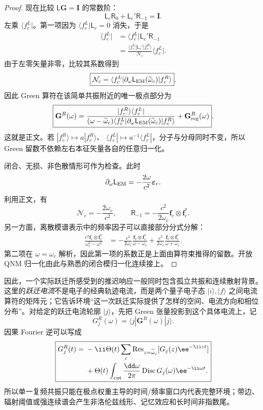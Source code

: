 \begin{proof}
现在比较 \(\mathsf L\mathbf G=\mathbf I\) 的常数阶：
\[
\mathsf L_c\mathsf R_0
+\mathsf L_c'\mathsf R_{-1}
=\mathbf I.
\]
左乘 \(\langle f_c^L|\)。第一项因为
\(\langle f_c^L|\mathsf L_c=0\) 消失，于是
\begin{align*}
\langle f_c^L|
&=\langle f_c^L|\mathsf L_c'\mathsf R_{-1}\\
&=\frac{\langle f_c^L|\mathsf L_c'|f_c^R\rangle}
{\mathcal N_c}\langle f_c^L|.
\end{align*}
由于左零矢量非零，比较其系数得到
\[
\boxed{
\mathcal N_c
=\langle f_c^L|
\partial_\omega\mathsf L_{\rm EM}(\widetilde\omega_c)
|f_c^R\rangle }.
\]
因此 Green 算符在该简单共振附近的唯一极点部分为
\[
\boxed{
\mathbf G^R(\omega)
=\frac{|f_c^R\rangle\langle f_c^L|}
{(\omega-\widetilde\omega_c)
\langle f_c^L|\partial_\omega\mathsf L_{\rm EM}(\widetilde\omega_c)|f_c^R\rangle}
+\mathbf G_{\rm reg}^R(\omega)}.
\]
这就是正文。若
\(|f_c^R\rangle\mapsto a|f_c^R\rangle\)、
\(\langle f_c^L|\mapsto a^{-1}\langle f_c^L|\)，分子与分母同时不变，所以 Green 留数不依赖左右本征矢量各自的任意归一化。

闭合、无损、非色散情形可作为检查。此时
\[
\partial_\omega\mathsf L_{\rm EM}
=-\frac{2\omega}{c^2}\boldsymbol\varepsilon_r.
\]
利用正文，有
\[
\mathcal N_c=-\frac{2\omega_c}{c^2},
\qquad
\mathsf R_{-1}
=-\frac{c^2}{2\omega_c}
\mathbf f_c\otimes\mathbf f_c^*.
\]
另一方面，离散模谱表示中的频率因子可以直接部分分式分解：
\begin{align*}
\frac{c^2\mathbf f_c\otimes\mathbf f_c^*}{\omega_c^2-\omega^2}
&=-\frac{c^2}{2\omega_c}
\frac{\mathbf f_c\otimes\mathbf f_c^*}{\omega-\omega_c}
+\frac{c^2}{2\omega_c}
\frac{\mathbf f_c\otimes\mathbf f_c^*}{\omega+\omega_c}.
\end{align*}
第二项在 \(\omega=\omega_c\) 解析，因此第一项的系数正是上面由算符束推得的留数。开放 QNM 归一化由此与熟悉的闭合模归一化连续接上。
\end{proof}


因此，一个实际跃迁所感受到的推迟响应一般同时包含孤立共振和连续散射背景。这里的\emph{跃迁电流}不是电子的经典轨迹电流，而是两个量子电子态 $|i\rangle,|f\rangle$ 之间电流算符的矩阵元；它告诉环境“这一次跃迁实际提供了怎样的空间、电流方向和相位分布”。对给定的跃迁电流轮廓 $|j\rangle$，先把 Green 张量投影到这个具体电流上，记
\[
G_j^R(\omega)=\langle j|\mathbf G^R(\omega)|j\rangle .
\]
因果 Fourier 逆可以写成
\begin{equation}
\boxed{
\begin{aligned}
G_j^R(t)
={}&-\ii\Theta(t)
\sum_c\operatorname{Res}_{z=\widetilde\omega_c}
[G_j(z)\ee^{-\ii zt}]\\
&+\Theta(t)\int_{\rm cut}\frac{\dd\omega}{2\pi}
\operatorname{Disc}G_j(\omega)\ee^{-\ii\omega t}.
\end{aligned}}
\label{eq:green_time_response_poles_plus_cut}
\end{equation}
所以单一复频共振只能在极点权重主导的时间/频率窗口内代表完整环境；带边、辐射阈值或强连续谱会产生非洛伦兹线形、记忆效应和长时间非指数尾。

